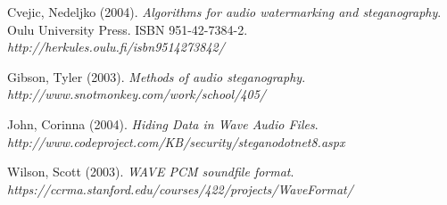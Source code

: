 \documentclass[12pt]{article}
\begin{document}
\newpage

\begin{thebibliography}{99}

Cvejic, Nedeljko (2004). \emph{Algorithms for audio watermarking and steganography}. Oulu University Press. ISBN 951-42-7384-2. \emph{http://herkules.oulu.fi/isbn9514273842/}


Gibson, Tyler (2003). \emph{Methods of audio steganography}. \emph{http://www.snotmonkey.com/work/school/405/}

John, Corinna (2004). \emph{Hiding Data in Wave Audio Files}. \emph{http://www.codeproject.com/KB/security/steganodotnet8.aspx}

Wilson, Scott (2003). \emph{WAVE PCM soundfile format}. \emph{https://ccrma.stanford.edu/courses/422/projects/WaveFormat/}

\end{thebibliography}
\end{document}
